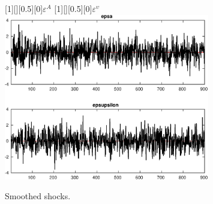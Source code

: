  
\begin{figure}[H]
[1][][0.5][0]{$ {\varepsilon^A} $}
[1][][0.5][0]{$ {\varepsilon^\upsilon} $}
\centering 
\includegraphics[width=0.80\textwidth]{KimModTheBuilder_SmoothedShocks1}
\caption{Smoothed shocks.}\label{Fig:SmoothedShocks:1}
\end{figure}


